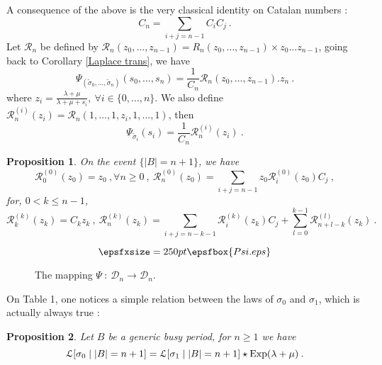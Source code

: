 \documentclass[11pt,a4paper]{article}
\numberwithin{equation}{section}
\newtheorem{prop}{Proposition}[section]
\newcommand{\mrm}[1]{\text{\rm #1}}
\newcommand{\D}{\mathcal{D}}
\newcommand{\cR}{\mathcal{R}}
\newcommand{\1}{\mathbbm{1}}
\newcommand{\Lom}{\mathcal{L}}
\begin{document}
A consequence of the above is the very classical identity on Catalan
numbers :
\begin{equation*}
C_n=\sum_{i+j=n-1}C_iC_j\:.
\end{equation*}
Let $\cR_n$ be defined by $\cR_n(z_0,\dots,z_{n-1})=R_n(z_0,\dots,z_{n-1})\times z_0 \dots z_{n-1}$, going back to Corollary \ref{Laplace trans}, we have
\begin{equation*}
\Psi_{(\tilde{\sigma}_0,\dots,\tilde{\sigma
}_{n})}(s_0,\dots,s_n)=\frac{1}{C_n}\cR_n(z_0,\dots,z_{n-1}).z_n\:.
\end{equation*}
where $z_i = \frac{\lambda+\mu}{ \lambda + \mu + s_i},\: \forall i \in
\{0,\dots,n\}$. We also define $\cR_n^{(i)}(z_i)=\cR_n(1,\dots,1,z_{i},1,\dots,1)$, then
\begin{equation*}
\Psi_{\tilde{\sigma}_i} (s_i) =\frac{1}{C_n}\cR_n^{(i)}(z_i)\:.
\end{equation*}
\begin{prop}\label{Rec}
On the event $\{|B|=n+1\}$, we have
\begin{equation}
\cR_0^{(0)}(z_0)=z_0\:,\forall n \geq 0\:,\:\cR_n^{(0)}(z_0)=\sum_{i+j=n-1}z_0\cR_i^{(0)}(z_0)C_j\:,
\end{equation}
for, $0< k \leq n-1$,
\begin{equation}
\cR_k^{(k)}(z_k)=C_k z_k\:,\:\cR_n^{(k)}(z_k)=\sum_{i+j=n-k-1}\cR_i^{(k)}(z_k)C_j +
\sum_{l=0}^{k-1}\cR_{n+l-k}^{(l)}(z_k) \:.
\end{equation}
\end{prop}
\begin{center}
\begin{figure}[hbt]
\[\epsfxsize=250pt \epsfbox{Psi.eps} \]
\caption{The mapping $\Psi\: :\: \D_n \longrightarrow \D_n.$}
\label{Psi}
\end{figure}
\end{center}
On Table 1, one notices a simple relation between the laws of
$\sigma_0$ and $\sigma_1$, which is actually always true :
\begin{prop}
Let $B$ be a generic busy period, for $n \geq 1$ we have
\begin{equation}
\Lom[\sigma_0 \mid |B|=n+1]=\Lom[\sigma_1 \mid |B|=n+1]\star \mrm{Exp}(\lambda+\mu)\:.
\end{equation}
\end{prop}
\end{document}
